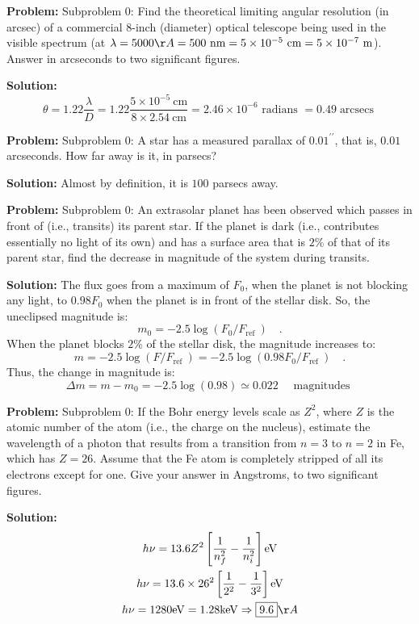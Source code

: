 \documentclass[10pt]{article}
\begin{document}
\textbf{Problem:}
Subproblem 0: Find the theoretical limiting angular resolution (in arcsec) of a commercial 8-inch (diameter) optical telescope being used in the visible spectrum (at $\lambda=5000 \AA=500 \mathrm{~nm}=5 \times 10^{-5} \mathrm{~cm}=5 \times 10^{-7} \mathrm{~m}$).  Answer in arcseconds to two significant figures.


\textbf{Solution:}
\[
\theta=1.22 \frac{\lambda}{D}=1.22 \frac{5 \times 10^{-5} \mathrm{~cm}}{8 \times 2.54 \mathrm{~cm}}=2.46 \times 10^{-6} \text { radians }=\boxed{0.49} \operatorname{arcsecs}
\]


\textbf{Problem:}
Subproblem 0: A star has a measured parallax of $0.01^{\prime \prime}$, that is, $0.01$ arcseconds. How far away is it, in parsecs?


\textbf{Solution:}
Almost by definition, it is $\boxed{100}$ parsecs away.


\textbf{Problem:}
Subproblem 0: An extrasolar planet has been observed which passes in front of (i.e., transits) its parent star. If the planet is dark (i.e., contributes essentially no light of its own) and has a surface area that is $2 \%$ of that of its parent star, find the decrease in magnitude of the system during transits.


\textbf{Solution:}
The flux goes from a maximum of $F_{0}$, when the planet is not blocking any light, to $0.98 F_{0}$ when the planet is in front of the stellar disk. So, the uneclipsed magnitude is:
\[
m_{0}=-2.5 \log \left(F_{0} / F_{\text {ref }}\right) \quad .
\]
When the planet blocks $2 \%$ of the stellar disk, the magnitude increases to:
\[
m=-2.5 \log \left(F / F_{\text {ref }}\right)=-2.5 \log \left(0.98 F_{0} / F_{\text {ref }}\right) \quad .
\]
Thus, the change in magnitude is:
\[
\Delta m=m-m_{0}=-2.5 \log (0.98) \simeq \boxed{0.022} \quad \text { magnitudes }
\]


\textbf{Problem:}
Subproblem 0: If the Bohr energy levels scale as $Z^{2}$, where $Z$ is the atomic number of the atom (i.e., the charge on the nucleus), estimate the wavelength of a photon that results from a transition from $n=3$ to $n=2$ in Fe, which has $Z=26$. Assume that the Fe atom is completely stripped of all its electrons except for one.  Give your answer in Angstroms, to two significant figures.


\textbf{Solution:}
\[
\begin{gathered}
h \nu=13.6 Z^{2}\left[\frac{1}{n_{f}^{2}}-\frac{1}{n_{i}^{2}}\right] \mathrm{eV} \\
h \nu=13.6 \times 26^{2}\left[\frac{1}{2^{2}}-\frac{1}{3^{2}}\right] \mathrm{eV} \\
h \nu=1280 \mathrm{eV}=1.28 \mathrm{keV} \Rightarrow \boxed{9.6} \AA
\end{gathered}
\]
\end{document}
